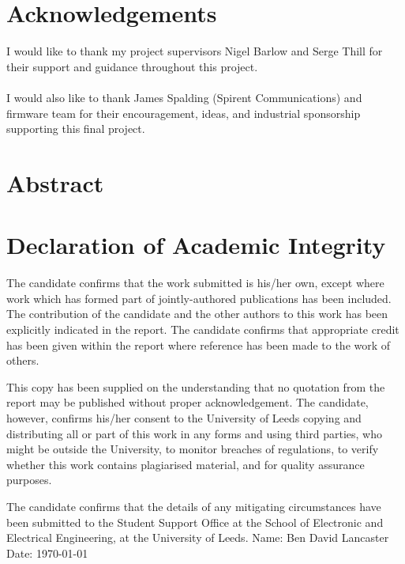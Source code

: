 \documentclass[11pt,a4paper]{report}
\begin{document}
\newpage
\chapter*{Acknowledgements}
I would like to thank my project supervisors Nigel Barlow and Serge Thill for their support and guidance throughout this project. 
\\\\
I would also like to thank James Spalding (Spirent Communications) and firmware team for their encouragement, ideas, and industrial sponsorship supporting this final project.

\newpage
\chapter*{Abstract}
\startcontents[chapters]
\noindent
\lipsum[1-3]


\chapter*{Declaration of Academic Integrity}

The candidate confirms that the work submitted is his/her own, except where work which has formed part of jointly-authored publications has been included. The contribution of the candidate and the other authors to this work has been explicitly indicated in the report. The candidate confirms that appropriate credit has been given within the report where reference has been made to the work of others.

This copy has been supplied on the understanding that no quotation from the report may be published without proper acknowledgement. The candidate, however, confirms his/her consent to the University of Leeds copying and distributing all or part of this work in any forms and using third parties, who might be outside the University, to monitor breaches of regulations, to verify whether this work contains plagiarised material, and for quality assurance purposes.

The candidate confirms that the details of any mitigating circumstances have been submitted to the Student Support Office at the School of Electronic and Electrical Engineering, at the University of Leeds.
\vfill
\noindent Name:	Ben David Lancaster \\
Date:	\today
\newpage


\newpage
\renewcommand*\contentsname{Table of Contents}
{%
\tableofcontents
}
\newpage
\end{document}
